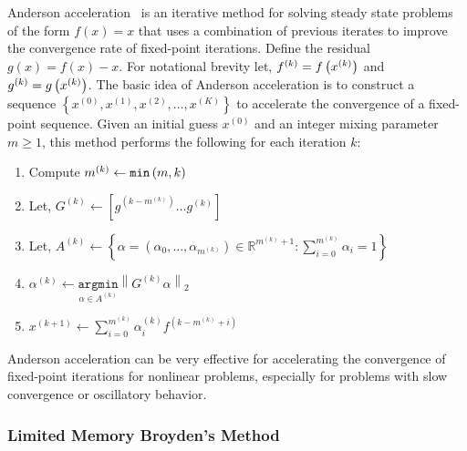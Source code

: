 
Anderson acceleration~\citep{anderson1965iterative} is an iterative method for solving steady state problems of the form $f(x) = x$ that uses a combination of previous iterates to improve the convergence rate of fixed-point iterations. Define the residual $g(x) = f(x) - x$. For notational brevity let, $f^{(k)} =  f\left(x^{(k)}\right)$ and $g^{(k)} = g\left(x^{(k)}\right)$. The basic idea of Anderson acceleration is to construct a sequence $\left\{x^{(0)}, x^{(1)}, x^{(2)}, \ldots, x^{(K)}\right\}$ to accelerate the convergence of a fixed-point sequence. Given an initial guess $x^{(0)}$ and an integer mixing parameter $m \geq 1$, this method performs the following for each iteration $k$:
%
\begin{enumerate}
  \item Compute $m^{(k)} \leftarrow \texttt{min}\left(m, k\right)$
  \item Let, $G^{(k)} \leftarrow \left[ g^{(k - m^{(k)})} \ldots g^{(k)} \right]$
  \item Let, $A^{(k)} \leftarrow \left\{ \alpha = \left( \alpha_0, \ldots, \alpha_{m^{(k)}} \right) \in \mathbb{R}^{m^{(k)} + 1} : \sum_{i = 0}^{m^{(k)}} \alpha_i = 1 \right\}$
  \item $\alpha^{(k)} \leftarrow \underset{\alpha \in A^{(k)}}{\texttt{argmin}} \left\| G^{(k)} \alpha \right\|_2$
  \item $x^{(k+1)} \leftarrow \sum_{i = 0}^{m^{(k)}} \alpha^{(k)}_i f^{(k - m^{(k)} + i)}$
\end{enumerate}
%
Anderson acceleration can be very effective for accelerating the convergence of fixed-point iterations for nonlinear problems, especially for problems with slow convergence or oscillatory behavior.

\subsubsection{Limited Memory Broyden's Method}
\label{subsec:limited_memory_broyden}

